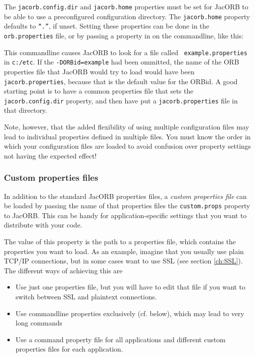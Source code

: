 The {\tt jacorb.config.dir} and {\tt jacorb.home} properties must be
set for JacORB to be able to use a preconfigured configuration
directory. The {\tt jacorb.home} property defaults to {\tt ``.''}, if
unset. Setting these properties can be done in the {\tt
  orb.properties} file, or by passing a property in on the
commandline, like this:


This commandline causes JacORB to look for a file called {\tt
  example.properties} in {\tt c:/etc}. If the {\tt -DORBid=example}
had been ommitted, the name of the ORB properties file that JacORB
would try to load would have been {\tt jacorb.properties}, because
that is the default value for the ORBid. A good starting point is to
have a common properties file that sets the {\tt jacorb.config.dir}
property, and then have put a {\tt jacorb.properties} file in that
directory.

Note, however, that the added flexibility of using multiple
configuration files may lead to individual properties defined in
multiple files. You must know the order in which your configuration
files are loaded to avoid confusion over property settings not having
the expected effect!

\subsubsection{Custom properties files}

In addition to the standard JacORB properties files, a {\em custom
  properties file} can be loaded by passing the name of that
properties files the {\tt custom.props} property to JacORB. This can
be handy for application-specific settings that you want to distribute
with your code.

The value of this property is the path to a properties file, which
contains the properties you want to load. As an example, imagine that
you usually use plain TCP/IP connections, but in some cases want to
use SSL (see section \ref{ch:SSL}). The different ways of achieving
this are

\begin{itemize}
\item Use just one properties file, but you will have to edit that
  file if you want to switch between SSL and
plaintext connections.
\item Use commandline properties exclusively (cf. below), which may lead to very long
commands
\item Use a command property file for all applications and different
  custom properties files for each application.
\end{itemize}


